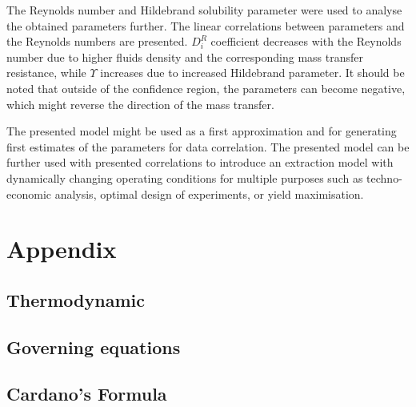 \documentclass[a4paper,fleqn]{cas-dc}
\begin{document}
The Reynolds number and Hildebrand solubility parameter were used to analyse the obtained parameters further. The linear correlations between parameters and the Reynolds numbers are presented. $D_i^R$ coefficient decreases with the Reynolds number due to higher fluids density and the corresponding mass transfer resistance, while $\Upsilon$ increases due to increased Hildebrand parameter. It should be noted that outside of the confidence region, the parameters can become negative, which might reverse the direction of the mass transfer.

The presented model might be used as a first approximation and for generating first estimates of the parameters for data correlation. The presented model can be further used with presented correlations to introduce an extraction model with dynamically changing operating conditions for multiple purposes such as techno-economic analysis, optimal design of experiments, or yield maximisation.

\clearpage
%



\clearpage \appendix \label{appendix}
\section{Appendix} 
\subsection{Thermodynamic}


\subsection{Governing equations}


\subsection{Cardano's Formula} \label{CH: Cardano}


%
\end{document}
